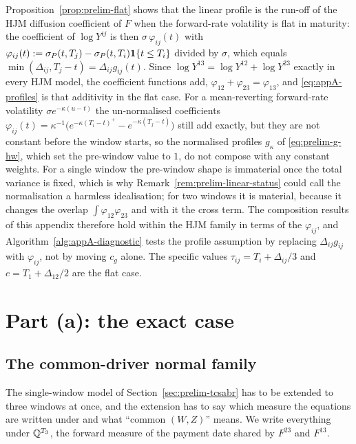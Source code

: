 \documentclass[../../main.tex]{subfiles}
\begin{document}
\begin{remark}\label{rem:appA-hjm}
Proposition~\ref{prop:prelim-flat} shows that the linear profile is the run-off of the HJM diffusion coefficient of $F$ when the forward-rate volatility is flat in maturity: the coefficient of $\log Y^{ij}$ is then $\sigma\,\varphi_{ij}(t)$ with $\varphi_{ij}(t):=\sigma_P(t,T_j)-\sigma_P(t,T_i)\mathbf{1}\{t\le T_i\}$ divided by $\sigma$, which equals $\min(\Delta_{ij},T_j-t)=\Delta_{ij}g_{ij}(t)$. Since $\log Y^{13}=\log Y^{12}+\log Y^{23}$ exactly in every HJM model, the coefficient functions add, $\varphi_{12}+\varphi_{23}=\varphi_{13}$, and \eqref{eq:appA-profiles} is that additivity in the flat case. For a mean-reverting forward-rate volatility $\sigma e^{-\kappa(u-t)}$ the un-normalised coefficients $\varphi_{ij}(t)=\kappa^{-1}\big(e^{-\kappa(T_i-t)^+}-e^{-\kappa(T_j-t)}\big)$ still add exactly, but they are not constant before the window starts, so the normalised profiles $g_\kappa$ of \eqref{eq:prelim-g-hw}, which set the pre-window value to $1$, do not compose with any constant weights. For a single window the pre-window shape is immaterial once the total variance is fixed, which is why Remark~\ref{rem:prelim-linear-status} could call the normalisation a harmless idealisation; for two windows it is material, because it changes the overlap $\int\varphi_{12}\varphi_{23}$ and with it the cross term. The composition results of this appendix therefore hold within the HJM family in terms of the $\varphi_{ij}$, and Algorithm~\ref{alg:appA-diagnostic} tests the profile assumption by replacing $\Delta_{ij}g_{ij}$ with $\varphi_{ij}$, not by moving $c_g$ alone. The specific values $\tau_{ij}=T_i+\Delta_{ij}/3$ and $c=T_1+\Delta_{12}/2$ are the flat case.
\end{remark}

\section{Part (a): the exact case}\label{sec:appA-exact}

\subsection{The common-driver normal family}

The single-window model of Section~\ref{sec:prelim-tcsabr} has to be extended to three windows at once, and the extension has to say which measure the equations are written under and what ``common $(W,Z)$'' means. We write everything under $\mathbb{Q}^{T_3}$, the forward measure of the payment date shared by $F^{23}$ and $F^{13}$.
\end{document}
